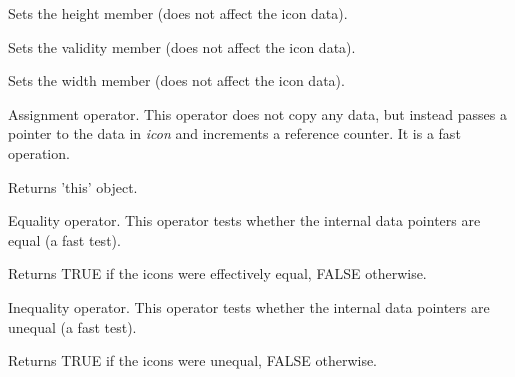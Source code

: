 \label{wxiconsetheight}


Sets the height member (does not affect the icon data).





Sets the validity member (does not affect the icon data).





Sets the width member (does not affect the icon data).





Assignment operator. This operator does not copy any data, but instead
passes a pointer to the data in {\it icon} and increments a reference
counter. It is a fast operation.




Returns 'this' object.



Equality operator. This operator tests whether the internal data pointers are
equal (a fast test).




Returns TRUE if the icons were effectively equal, FALSE otherwise.



Inequality operator. This operator tests whether the internal data pointers are
unequal (a fast test).




Returns TRUE if the icons were unequal, FALSE otherwise.


